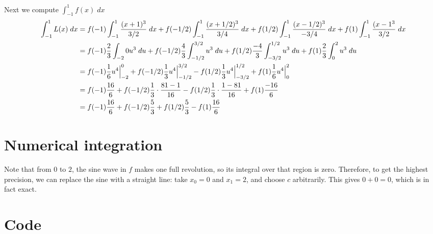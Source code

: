 \documentclass[11pt,letterpaper]{article}
\begin{document}
\newcommand{\uint}{\int_{-1}^1}
Next we compute $\int_{-1}^1 f(x) \; dx$
%
\begin{align*}
  \uint L(x) \; dx
  &= f(-1) \uint \frac{(x + 1)^3}{3/2} \; dx
  + f(-1/2) \uint \frac{(x + 1/2)^3}{3/4} \; dx
  + f(1/2) \uint \frac{(x - 1/2)^3}{-3/4} \; dx
  + f(1) \uint \frac{(x - 1^3}{3/2} \; dx
  \\
  &= f(-1) \frac{2}{3} \int_{-2}{0} u^3 \; du
  + f(-1/2) \frac{4}{3} \int_{-1/2}^{3/2} u^3 \; du
  + f(1/2) \frac{-4}{3} \int_{-3/2}^{1/2} u^3 \; du
  + f(1) \frac{2}{3} \int_{0}^{2} u^3 \; du
  \\
  &= f(-1) \frac{1}{6} u^4 \evaluated[-2]{0}
  + f(-1/2) \frac{1}{3} u^4 \evaluated[-1/2]{3/2}
  -  f(1/2) \frac{1}{3} u^4 \evaluated[-3/2]{1/2}
  + f(1) \frac{1}{6} u^4 \evaluated[0]{2}
  \\
  &= f(-1) \frac{16}{6}
  + f(-1/2) \frac{1}{3} \cdot \frac{81 - 1}{16}
  - f(1/2) \frac{1}{3} \cdot \frac{1 - 81}{16}
  + f(1) \frac{-16}{6} \\
  &= f(-1) \frac{16}{6}
  + f(-1/2) \frac{5}{3}
  + f(1/2) \frac{5}{3}
  - f(1) \frac{16}{6}
\end{align*}

\section{Numerical integration}

Note that from $0$ to $2$, the sine wave in $f$ makes one full revolution, so
its integral over that region is zero.
Therefore, to get the highest precision, we can replace the sine with a
straight line: take $x_0 = 0$ and $x_1 = 2$, and choose $c$ arbitrarily. This
gives $0 + 0 = 0$, which is in fact exact.

\appendix

\section{Code}
\label{app:code}


\end{document}
